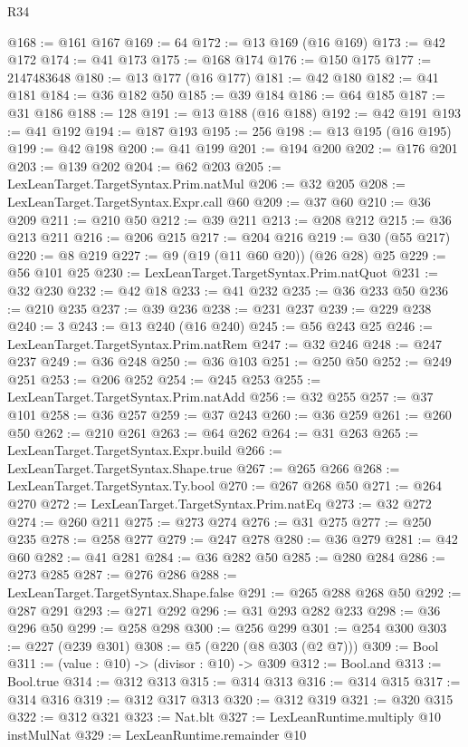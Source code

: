 \begin{lexlean}{R34}
\begin{coremodule}
@168 := @161 @167
@169 := 64
@172 := @13 @169 (@16 @169)
@173 := @42 @172
@174 := @41 @173
@175 := @168 @174
@176 := @150 @175
@177 := 2147483648
@180 := @13 @177 (@16 @177)
@181 := @42 @180
@182 := @41 @181
@184 := @36 @182 @50
@185 := @39 @184
@186 := @64 @185
@187 := @31 @186
@188 := 128
@191 := @13 @188 (@16 @188)
@192 := @42 @191
@193 := @41 @192
@194 := @187 @193
@195 := 256
@198 := @13 @195 (@16 @195)
@199 := @42 @198
@200 := @41 @199
@201 := @194 @200
@202 := @176 @201
@203 := @139 @202
@204 := @62 @203
@205 := LexLeanTarget.TargetSyntax.Prim.natMul
@206 := @32 @205
@208 := LexLeanTarget.TargetSyntax.Expr.call @60
@209 := @37 @60
@210 := @36 @209
@211 := @210 @50
@212 := @39 @211
@213 := @208 @212
@215 := @36 @213 @211
@216 := @206 @215
@217 := @204 @216
@219 := @30 (@55 @217)
@220 := @8 @219
@227 := @9 (@19 (@11 @60 @20)) (@26 @28) @25
@229 := @56 @101 @25
@230 := LexLeanTarget.TargetSyntax.Prim.natQuot
@231 := @32 @230
@232 := @42 @18
@233 := @41 @232
@235 := @36 @233 @50
@236 := @210 @235
@237 := @39 @236
@238 := @231 @237
@239 := @229 @238
@240 := 3
@243 := @13 @240 (@16 @240)
@245 := @56 @243 @25
@246 := LexLeanTarget.TargetSyntax.Prim.natRem
@247 := @32 @246
@248 := @247 @237
@249 := @36 @248
@250 := @36 @103
@251 := @250 @50
@252 := @249 @251
@253 := @206 @252
@254 := @245 @253
@255 := LexLeanTarget.TargetSyntax.Prim.natAdd
@256 := @32 @255
@257 := @37 @101
@258 := @36 @257
@259 := @37 @243
@260 := @36 @259
@261 := @260 @50
@262 := @210 @261
@263 := @64 @262
@264 := @31 @263
@265 := LexLeanTarget.TargetSyntax.Expr.build
@266 := LexLeanTarget.TargetSyntax.Shape.true
@267 := @265 @266
@268 := LexLeanTarget.TargetSyntax.Ty.bool
@270 := @267 @268 @50
@271 := @264 @270
@272 := LexLeanTarget.TargetSyntax.Prim.natEq
@273 := @32 @272
@274 := @260 @211
@275 := @273 @274
@276 := @31 @275
@277 := @250 @235
@278 := @258 @277
@279 := @247 @278
@280 := @36 @279
@281 := @42 @60
@282 := @41 @281
@284 := @36 @282 @50
@285 := @280 @284
@286 := @273 @285
@287 := @276 @286
@288 := LexLeanTarget.TargetSyntax.Shape.false
@291 := @265 @288 @268 @50
@292 := @287 @291
@293 := @271 @292
@296 := @31 @293 @282 @233
@298 := @36 @296 @50
@299 := @258 @298
@300 := @256 @299
@301 := @254 @300
@303 := @227 (@239 @301)
@308 := @5 (@220 (@8 @303 (@2 @7)))
@309 := Bool
@311 := (value : @10) -> (divisor : @10) -> @309
@312 := Bool.and
@313 := Bool.true
@314 := @312 @313
@315 := @314 @313
@316 := @314 @315
@317 := @314 @316
@319 := @312 @317 @313
@320 := @312 @319
@321 := @320 @315
@322 := @312 @321
@323 := Nat.blt
@327 := LexLeanRuntime.multiply @10 instMulNat
@329 := LexLeanRuntime.remainder @10

\end{coremodule}
\end{lexlean}
